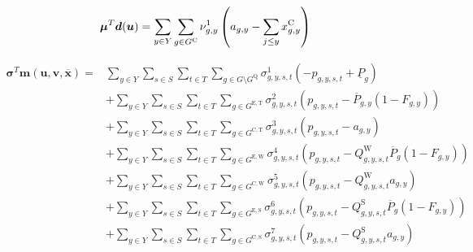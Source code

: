 \documentclass{article}
\newcommand{\sGenerators}{G}
\newcommand{\sGeneratorsExistingThermal}{G^{\mathrm{E,T}}}
\newcommand{\sGeneratorsExistingWind}{G^{\mathrm{E,W}}}
\newcommand{\sGeneratorsExistingSolar}{G^{\mathrm{E,S}}}
\newcommand{\sGeneratorsCandidate}{G^{\mathrm{C}}}
\newcommand{\sGeneratorsCandidateThermal}{G^{\mathrm{C,T}}}
\newcommand{\sGeneratorsCandidateWind}{G^{\mathrm{C,W}}}
\newcommand{\sGeneratorsCandidateSolar}{G^{\mathrm{C,S}}}
\newcommand{\sStorage}{G^{\mathrm{Q}}}
\newcommand{\sYears}{Y}
\newcommand{\sScenarios}{S}
\newcommand{\sIntervals}{T}
\newcommand{\iGenerator}{g}
\newcommand{\iYear}{y}
\newcommand{\iYearAlias}{j}
\newcommand{\iScenario}{s}
\newcommand{\iInterval}{t}
\newcommand{\cPowerOutputMax}[1][\iGenerator,\iYear]{\overline{P}_{#1}}
\newcommand{\cPowerOutputMin}[1][\iGenerator]{\underline{P}_{#1}}
\newcommand{\cCapacityFactorWind}[1][\iGenerator,\iYear,\iScenario,\iInterval]{Q_{#1}^{\mathrm{W}}}
\newcommand{\cCapacityFactorSolar}[1][\iGenerator,\iYear,\iScenario,\iInterval]{Q_{#1}^{\mathrm{S}}}
\newcommand{\cRetirementIndicator}[1][\iGenerator,\iYear]{F_{#1}}
\newcommand{\vInstalledCapacity}[1][\iGenerator,\iYear]{x^{\mathrm{C}}_{#1}}
\newcommand{\vPower}[1][\iGenerator,\iYear,\iScenario,\iInterval]{p_{#1}}
\newcommand{\vInstalledCapacityTotal}[1][\iGenerator,\iYear]{a_{#1}}
\newcommand{\dTotalInstallCapacity}[1][\iGenerator,\iYear]{\nu_{#1}^{1}}
\newcommand{\dMinPowerOutput}[1][\iGenerator,\iYear,\iScenario,\iInterval]{\sigma_{#1}^{1}}
\newcommand{\dMaxPowerOutputExistingThermal}[1][\iGenerator,\iYear,\iScenario,\iInterval]{\sigma_{#1}^{2}}
\newcommand{\dMaxPowerOutputCandidateThermal}[1][\iGenerator,\iYear,\iScenario,\iInterval]{\sigma_{#1}^{3}}
\newcommand{\dMaxPowerOutputWindExisting}[1][\iGenerator,\iYear,\iScenario,\iInterval]{\sigma_{#1}^{4}}
\newcommand{\dMaxPowerOutputWindCandidate}[1][\iGenerator,\iYear,\iScenario,\iInterval]{\sigma_{#1}^{5}}
\newcommand{\dMaxPowerOutputSolarExisting}[1][\iGenerator,\iYear,\iScenario,\iInterval]{\sigma_{#1}^{6}}
\newcommand{\dMaxPowerOutputSolarCandidate}[1][\iGenerator,\iYear,\iScenario,\iInterval]{\sigma_{#1}^{7}}
\begin{document}
\begin{equation}
	\bm{\mu}^{T}\bm{d}(\bm{u}) = \sum\limits_{\iYear \in \sYears} \sum\limits_{\iGenerator \in \sGeneratorsCandidate} \dTotalInstallCapacity \left(\vInstalledCapacityTotal - \sum\limits_{\iYearAlias\leq \iYear} \vInstalledCapacity\right)\\
\end{equation}

\begin{align}
		\bm{\sigma}^{T}\bm{m}(\bm{u}, \bm{v}, \bm{\overline{x}}) = & \sum\limits_{\iYear \in \sYears}\sum\limits_{\iScenario \in \sScenarios}\sum\limits_{\iInterval \in \sIntervals} \sum\limits_{\iGenerator \in \sGenerators \setminus \sStorage} \dMinPowerOutput \left(-\vPower + \cPowerOutputMin\right)\\
		& + \sum\limits_{\iYear \in \sYears}\sum\limits_{\iScenario \in \sScenarios}\sum\limits_{\iInterval \in \sIntervals} \sum\limits_{\iGenerator \in \sGeneratorsExistingThermal} \dMaxPowerOutputExistingThermal \left(\vPower - \cPowerOutputMax \left(1 - \cRetirementIndicator\right)\right)\\
		& + \sum\limits_{\iYear \in \sYears}\sum\limits_{\iScenario \in \sScenarios}\sum\limits_{\iInterval \in \sIntervals} \sum\limits_{\iGenerator \in \sGeneratorsCandidateThermal} \dMaxPowerOutputCandidateThermal \left(\vPower - \vInstalledCapacityTotal\right)\\
		& + \sum\limits_{\iYear \in \sYears}\sum\limits_{\iScenario \in \sScenarios}\sum\limits_{\iInterval \in \sIntervals} \sum\limits_{\iGenerator \in \sGeneratorsExistingWind} \dMaxPowerOutputWindExisting \left(\vPower - \cCapacityFactorWind \cPowerOutputMax[\iGenerator] \left(1 - \cRetirementIndicator\right) \right)\\
		& + \sum\limits_{\iYear \in \sYears}\sum\limits_{\iScenario \in \sScenarios}\sum\limits_{\iInterval \in \sIntervals} \sum\limits_{\iGenerator \in \sGeneratorsCandidateWind} \dMaxPowerOutputWindCandidate \left(\vPower - \cCapacityFactorWind \vInstalledCapacityTotal\right)\\
		& + \sum\limits_{\iYear \in \sYears}\sum\limits_{\iScenario \in \sScenarios}\sum\limits_{\iInterval \in \sIntervals} \sum\limits_{\iGenerator \in \sGeneratorsExistingSolar} \dMaxPowerOutputSolarExisting \left(\vPower - \cCapacityFactorSolar \cPowerOutputMax[\iGenerator] \left(1 - \cRetirementIndicator\right)\right)\\
		& + \sum\limits_{\iYear \in \sYears}\sum\limits_{\iScenario \in \sScenarios}\sum\limits_{\iInterval \in \sIntervals} \sum\limits_{\iGenerator \in \sGeneratorsCandidateSolar} \dMaxPowerOutputSolarCandidate \left(\vPower - \cCapacityFactorSolar \vInstalledCapacityTotal\right)\\

\end{align}
\end{document}
